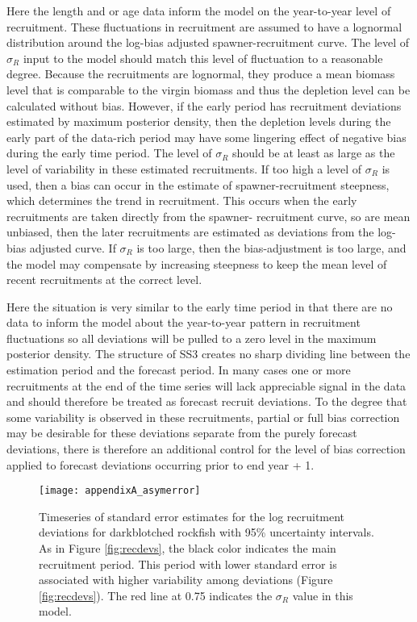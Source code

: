 Here the length and or age data inform the model on the year-to-year level of recruitment.  These fluctuations in recruitment are assumed to have a lognormal distribution around the log-bias adjusted spawner-recruitment curve.  The level of $\sigma_R$ input to the model should match this level of fluctuation to a reasonable degree.  Because the recruitments are lognormal, they produce a mean biomass level that is comparable to the virgin biomass and thus the depletion level can be calculated without bias.  However, if the early period has recruitment deviations estimated by maximum posterior density, then the depletion levels during the early part of the data-rich period may have some lingering effect of negative bias during the early time period. The level of $\sigma_R$ should be at least as large as the level of variability in these estimated recruitments.  If too high a level of $\sigma_R$ is used, then a bias can occur in the estimate of spawner-recruitment steepness, which determines the trend in recruitment.  This occurs when the early recruitments are taken directly from the spawner- recruitment curve, so are mean unbiased, then the later recruitments are estimated as deviations from the log-bias adjusted curve.  If $\sigma_R$ is too large, then the bias-adjustment is too large, and the model may compensate by increasing steepness to keep the mean level of recent recruitments at the correct level.

Here the situation is very similar to the early time period in that there are no data to inform the model about the year-to-year pattern in recruitment fluctuations so all deviations will be pulled to a zero level in the maximum posterior density.  The structure of SS3 creates no sharp dividing line between the estimation period and the forecast period.  In many cases one or more recruitments at the end of the time series will lack appreciable signal in the data and should therefore be treated as forecast recruit deviations.  To the degree that some variability is observed in these recruitments, partial or full bias correction may be desirable for these deviations separate from the purely forecast deviations, there is therefore an additional control for the level of bias correction applied to forecast deviations occurring prior to end year + 1.

\begin{figure}[H]
	\begin{center}
	\texttt{[image: appendixA\_asymerror]}\\
	\end{center}
	\caption{ Timeseries of standard error estimates for the log recruitment deviations for darkblotched rockfish with 95\% uncertainty intervals. As in Figure \ref{fig:recdevs}, the black color indicates the main recruitment period. This period with lower standard error is associated with higher variability among deviations (Figure \ref{fig:recdevs}). The red line at 0.75 indicates the  $\sigma_R$ value in this model.}
	\label{fig:recSE}
\end{figure}


